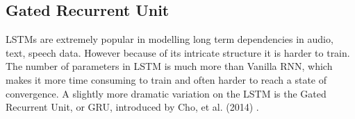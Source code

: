 \documentclass[letterpaper, 12 pt, conference]{ieeeconf}  %
\begin{document}


\subsection{Gated Recurrent Unit}
LSTMs are extremely popular in modelling long term dependencies in audio, text, speech data. However because of its intricate structure it is harder to train. The number of parameters in LSTM is much more than Vanilla RNN, which makes it more time consuming to train and often harder to reach a state of convergence. A slightly more dramatic variation on the LSTM is the Gated Recurrent Unit, or GRU, introduced by Cho, et al. (2014) \cite{gru_translation}. 
\end{document}
